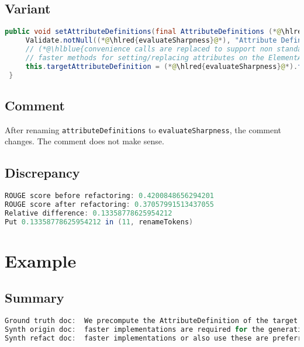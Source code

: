\documentclass[11pt]{article}
\DeclareRobustCommand{\hlred}[1]{{\sethlcolor{YellowOrange}\hl{#1}}}
\DeclareRobustCommand{\hlblue}[1]{{\sethlcolor{SeaGreen}\hl{#1}}}
\DeclareRobustCommand{\hlblue}[1]{{\sethlcolor{SkyBlue}\hl{#1}}}
\begin{document}
\subsection{Variant}

\begin{lstlisting}[language=java]
 public void setAttributeDefinitions(final AttributeDefinitions (*@\hlred{evaluateSharpness}@*)) {
     Validate.notNull((*@\hlred{evaluateSharpness}@*), "Attribute Definitions cannot be null");
     // (*@\hlblue{convenience calls are replaced to support non standard methods but with only support on standard objects}@*)
     // faster methods for setting/replacing attributes on the ElementAttributes implementation
     this.targetAttributeDefinition = (*@\hlred{evaluateSharpness}@*).forName(getTemplateMode(), this.targetAttrCompleteName);
 }
\end{lstlisting}
\subsection{Comment}

After renaming \texttt{attributeDefinitions} to \texttt{evaluateSharpness}, the comment changes. The comment does not make sense.

\subsection{Discrepancy}

\begin{lstlisting}[language=java]
ROUGE score before refactoring: 0.4200848656294201
ROUGE score after refactoring: 0.37057991513437055
Relative difference: 0.13358778625954212
Put 0.13358778625954212 in (11, renameTokens)
\end{lstlisting}




\pagebreak
\section{Example}
\subsection{Summary}

\begin{lstlisting}[language=java]
Ground truth doc:  We precompute the AttributeDefinition of the target attribute in order to being able to use much
Synth origin doc:  faster implementations are required for the generation but cannot override or replace attributes instead of just
Synth refact doc:  faster implementations or also use these are preferred for all other or even using other than
\end{lstlisting}
\end{document}
